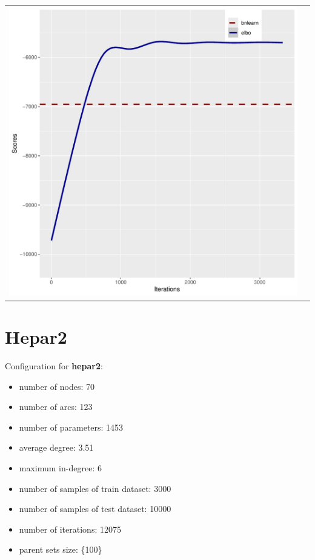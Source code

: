 \documentclass[]{scrartcl}
\begin{document}
\begin{tabular}{cc}
\includegraphics[scale = 0.4]{./figs/alarm/mapEvolution-5-3332.pdf} & \\
\end{tabular}

\clearpage

\section{Hepar2}

Configuration for \textbf{hepar2}:

\begin{itemize}
\item number of nodes: 70
\item number of arcs: 123
\item number of parameters: 1453
\item average degree: 3.51
\item maximum in-degree: 6
\item number of samples of train dataset: 3000
\item number of samples of test dataset: 10000
\item number of iterations: 12075
\item parent sets size: \{100\}
\end{itemize}
\end{document}
